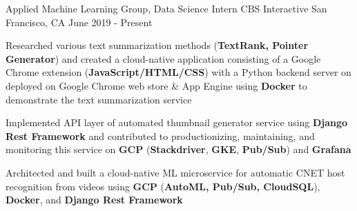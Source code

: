 

\begin{cventries}

\cventry
    {Applied Machine Learning Group, Data Science Intern} %
    {CBS Interactive} %
    {San Francisco, CA} %
    {June 2019 - Present} %
    {
      \begin{cvitems} %
 		\item {Researched various text summarization methods (\textbf{TextRank, Pointer Generator}) and created a cloud-native application consisting of a Google Chrome extension (\textbf{JavaScript/HTML/CSS}) with a Python backend server on deployed on Google Chrome web store \& App Engine using \textbf{Docker} to demonstrate the text summarization service}
 		\item {Implemented API layer of automated thumbnail generator service using \textbf{Django Rest Framework} and contributed to productionizing, maintaining, and monitoring this service on \textbf{GCP} (\textbf{Stackdriver}, \textbf{GKE}, \textbf{Pub/Sub}) and \textbf{Grafana}}
  		\item {Architected and built a cloud-native ML microservice for automatic CNET host recognition from videos using \textbf{GCP} (\textbf{AutoML, Pub/Sub, CloudSQL}), \textbf{Docker}, and \textbf{Django Rest Framework}}
      \end{cvitems}
    }


\end{cventries}
